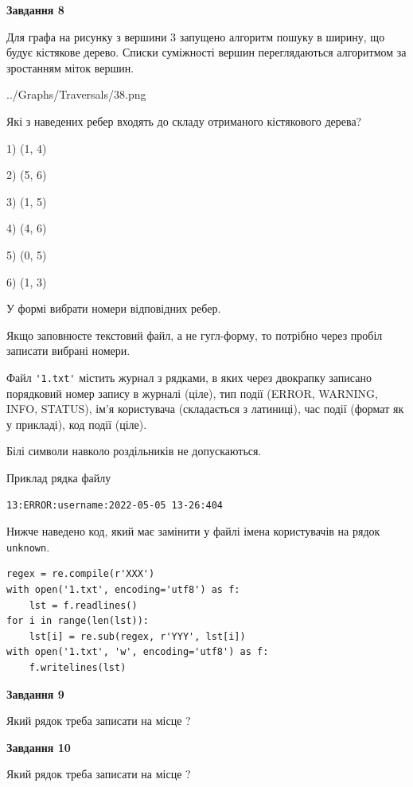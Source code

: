 \documentclass[12pt, ukrainian]{article}
\def\code#1{\Verb!#1!}
\begin{document}
{\begin {large}
{\begin {center}\textbf{Завдання 8}\end {center}}\par
Для графа на рисунку з вершини 3 запущено алгоритм пошуку в ширину, що будує кістякове дерево. Списки суміжності вершин переглядаються алгоритмом за зростанням міток вершин.\par
\begin{center}
	{../Graphs/Traversals/38.png}
\end{center}
\par Які з наведених ребер входять до складу отриманого кістякового дерева?\par
1) (1, 4)\par
2) (5, 6)\par
3) (1, 5)\par
4) (4, 6)\par
5) (0, 5)\par
6) (1, 3)\par
{\vskip 15pt} У формі вибрати номери відповідних ребер.


Якщо заповнюєте текстовий файл, а не гугл-форму, то потрібно через пробіл записа\-ти вибрані номери.\par
\newpage


Файл \code{'1.txt'} містить журнал з рядками, в яких через двокрапку записано поряд\-ко\-вий номер запису в журналі (ціле), тип події (ERROR, WARNING, INFO, STATUS), ім'я користувача (складається з латиниці), час події (фор\-мат як у прикладі), код події (ціле).

Білі символи навколо роздільників не допускаються.

Приклад рядка файлу



\begin{verbatim}
13:ERROR:username:2022-05-05 13-26:404
\end{verbatim}


Нижче наведено код, який має замінити у файлі імена користувачів на рядок \code{unknown}.



\begin{verbatim}
regex = re.compile(r'XXX')
with open('1.txt', encoding='utf8') as f:
    lst = f.readlines()
for i in range(len(lst)):
    lst[i] = re.sub(regex, r'YYY', lst[i])
with open('1.txt', 'w', encoding='utf8') as f:
    f.writelines(lst)
\end{verbatim}




{\begin {center}\textbf{Завдання 9}\end {center}}\par
Який рядок треба записати на місце  ?\par
\vspace{5mm}


{\begin {center}\textbf{Завдання 10}\end {center}}\par
Який рядок треба записати на місце  ?\par


\newpage


\end {large}}
\end{document}
